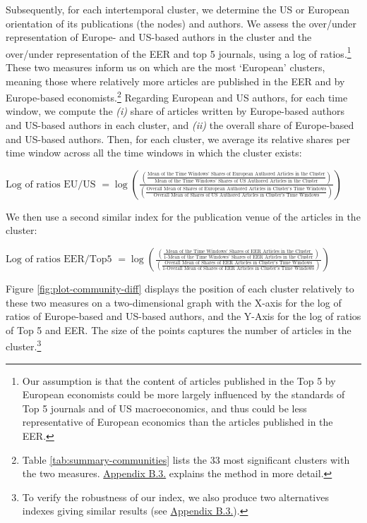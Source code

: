 \documentclass[
  12pt,
  onecolumn]{article}
\begin{document}
Subsequently, for each intertemporal cluster, we determine the US or European orientation of its publications (the nodes) and authors. We assess the over/under representation of Europe- and US-based authors in the cluster and the over/under representation of the EER and top 5 journals, using a log of ratios.\footnote{Our assumption is that the content of articles published in the Top 5 by European economists could be more largely influenced by the standards of Top 5 journals and of US macroeconomics, and thus could be less representative of European economics than the articles published in the EER.} These two measures inform us on which are the most `European' clusters, meaning those where relatively more articles are published in the EER and by Europe-based economists.\footnote{Table \ref{tab:summary-communities} lists the 33 most significant clusters with the two measures. \protect\hyperlink{network}{Appendix B.3.} explains the method in more detail.} Regarding European and US authors, for each time window, we compute the \emph{(i)} share of articles written by Europe-based authors and US-based authors in each cluster, and \emph{(ii)} the overall share of Europe-based and US-based authors. Then, for each cluster, we average its relative shares per time window across all the time windows in which the cluster exists:

\bigskip

\({\scriptstyle \text{Log of ratios EU/US }=\log(\frac{(\frac{\text{Mean of the Time Windows' Shares of European Authored Articles in the Cluster}}{\text{Mean of the Time Windows' Shares of US Authored Articles in the Cluster}})} {(\frac{\text{Overall Mean of Shares of European Authored Articles in Cluster's Time Windows}}{\text{Overall Mean of Shares of US Authored Articles in Cluster's Time Windows}})})}\)
\bigskip

We then use a second similar index for the publication venue of the articles in the cluster:

\bigskip

\({\scriptstyle \text{Log of ratios EER/Top5 }=\log(\frac{(\frac{\text{Mean of the Time Windows' Shares of EER Articles in the Cluster}}{\text{1-Mean of the Time Windows' Shares of EER Articles in the Cluster}})} {(\frac{\text{Overall Mean of Shares of EER Articles in Cluster's Time Windows}}{\text{1-Overall Mean of Shares of EER Articles in Cluster's Time Windows}})})}\)
\bigskip

Figure \ref{fig:plot-community-diff} displays the position of each cluster relatively to these two measures on a two-dimensional graph with the X-axis for the log of ratios of Europe-based and US-based authors, and the Y-Axis for the log of ratios of Top 5 and EER. The size of the points captures the number of articles in the cluster.\footnote{To verify the robustness of our index, we also produce two alternatives indexes giving similar results (see \protect\hyperlink{alt-index}{Appendix B.3.}).}
\end{document}
